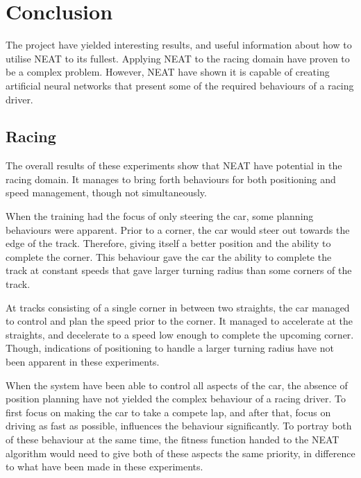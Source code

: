 \chapter{Conclusion}
\label{conclusion}
The project have yielded interesting results, and useful information about how to utilise NEAT to its fullest. Applying NEAT to the racing domain have proven to be a complex problem. However, NEAT have shown it is capable of creating artificial neural networks that present some of the required behaviours of a racing driver.


\section{Racing}
\label{conclusion_racing}
The overall results of these experiments show that NEAT have potential in the racing domain. It manages to bring forth behaviours for both positioning and speed management, though not simultaneously. 

When the training had the focus of only steering the car, some planning behaviours were apparent. Prior to a corner, the car would steer out towards the edge of the track. Therefore, giving itself a better position and the ability to complete the corner. This behaviour gave the car the ability to complete the track at constant speeds that gave larger turning radius than some corners of the track.

At tracks consisting of a single corner in between two straights, the car managed to control and plan the speed prior to the corner. It managed to accelerate at the straights, and decelerate to a speed low enough to complete the upcoming corner. Though, indications of positioning to handle a larger turning radius have not been apparent in these experiments.

When the system have been able to control all aspects of the car, the absence of position planning have not yielded the complex behaviour of a racing driver. To first focus on making the car to take a compete lap, and after that, focus on driving as fast as possible, influences the behaviour significantly. To portray both of these behaviour at the same time, the fitness function handed to the NEAT algorithm would need to give both of these aspects the same priority, in difference to what have been made in these experiments.


